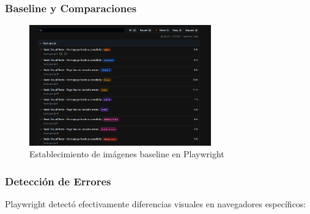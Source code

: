 \documentclass{article}
\begin{document}
\subsubsection{Baseline y Comparaciones}
\begin{figure}[H]
\centering
\includegraphics[width=0.7\textwidth]{playwright/2Baseline.png}
\caption{Establecimiento de imágenes baseline en Playwright}
\label{fig:playwright-baseline}
\end{figure}

\subsubsection{Detección de Errores}
Playwright detectó efectivamente diferencias visuales en navegadores específicos:
\end{document}
